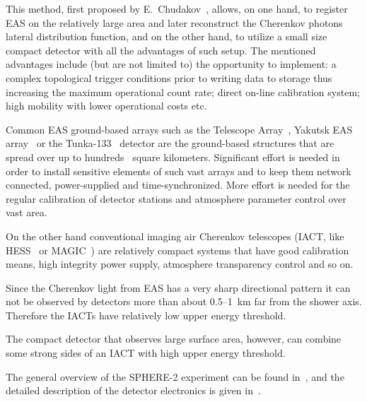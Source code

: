 \documentclass[final,5p,times,twocolumn]{elsarticle}
\begin{document}
This method, first proposed by E.~Chudakov~\cite{chu74}, allows, on one hand, to register EAS on the relatively large area and later reconstruct the Cherenkov photons lateral distribution function, and on the other hand, to utilize a small size compact detector with all the advantages of such setup. The mentioned advantages include (but are not limited to) the opportunity to implement: a complex topological trigger conditions prior to writing data to storage thus increasing the maximum operational count rate; direct on-line calibration system; high mobility with lower operational costs etc.

Common EAS ground-based arrays such as the Telescope Array~\cite{abu12}, Yakutsk EAS array~\cite{} or the Tunka-133~\cite{} detector are the ground-based structures that are spread over up to hundreds~\cite{abu12} square kilometers. Significant effort is needed in order to install sensitive elements of such vast arrays and to keep them network connected, power-supplied and time-synchronized. More effort is needed for the regular calibration of detector stations and atmosphere parameter control over vast area. 

On the other hand conventional imaging air Cherenkov telescopes (IACT, like HESS~\cite{} or MAGIC~\cite{}) are relatively compact systems that have good calibration means, high integrity power supply, atmosphere transparency control and so on.

Since the Cherenkov light from EAS has a very sharp directional pattern it can not be observed by detectors more than about 0.5--1~km far from the shower axis. Therefore the IACTs have relatively low upper energy threshold.

The compact detector that observes large surface area, however, can combine some strong sides of an IACT with high upper energy threshold. 

The general overview of the SPHERE-2 experiment can be found in~\cite{Ant15a}, and the detailed description of the detector electronics is given in~\cite{Ant20}.
\end{document}
